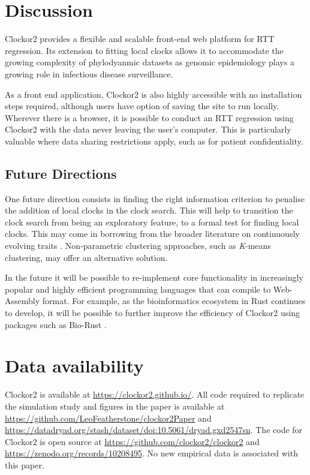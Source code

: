 \documentclass{article}
\begin{document}
\section*{Discussion}
Clockor2 provides a flexible and scalable front-end web platform for RTT regression. Its extension to fitting local clocks allows it to accommodate the growing complexity of phylodyanmic datasets as genomic epidemiology plays a growing role in infectious disease surveillance. 

As a front end application, Clockor2 is also highly accessible with no installation steps required, although users have option of saving the site to run locally. Wherever there is a browser, it is possible to conduct an RTT regression using Clockor2 with the data never leaving the user's computer. {This is particularly valuable where data sharing restrictions apply, such as for patient confidentiality.}

\subsection*{Future Directions}
{One future direction consists in finding the right information criterion to penalise the addition of local clocks in the clock search. This will help to transition the clock search from being an exploratory feature, to a formal test for finding local clocks. This may come in borrowing from the broader literature on continuously evolving traits \citep{bastide_2017_detection,khabbazian_2016_fast}.} Non-parametric clustering approaches, such as \textit{K}-means clustering, may offer an alternative solution.

In the future it will be possible to re-implement core functionality in increasingly popular and highly efficient programming languages that can compile to Web-Assembly format. For example, as the bioinformatics ecosystem in Rust continues to develop, it will be possible to further improve the efficiency of Clockor2 using packages such as Bio-Rust \citep{koester_rust-bio-2015}.

\section*{Data availability}
{Clockor2 is available at \url{https://clockor2.github.io/}}. All code required to replicate the simulation study and figures in the paper is available at \url{https://github.com/LeoFeatherstone/clockor2Paper} and \url{https://datadryad.org/stash/dataset/doi:10.5061/dryad.gxd2547sn}. The code for Clockor2 is open source at \url{https://github.com/clockor2/clockor2} and \url{https://zenodo.org/records/10208495}. No new empirical data is associated with this paper.
\end{document}
